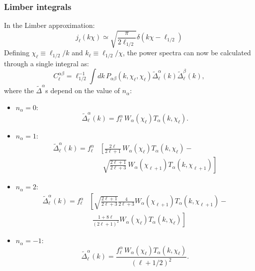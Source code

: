 \documentclass[\docopts]{\docclass}
\begin{document}
\subsubsection*{Limber integrals}
  In the Limber approximation:
  \begin{equation}
    j_\ell(k\chi)\simeq\sqrt{\frac{\pi}{2\ell_{1/2}}} \delta(k\chi-\ell_{1/2})
  \end{equation}
  Defining $\chi_\ell\equiv \ell_{1/2}/k$ and $k_\ell\equiv\ell_{1/2}/\chi$, the power spectra can now be calculated through a single integral as:
  \begin{equation}
    C^{\alpha\beta}_\ell=\ell_{1/2}^{-1}\int dk\,P_{\alpha\beta}(k,\chi_\ell,\chi_\ell)\tilde{\Delta}^\alpha_\ell(k)\tilde{\Delta}^\beta_\ell(k),
  \end{equation}
  where the $\tilde{\Delta}^\alpha$s depend on the value of $n_\alpha$:
  \begin{itemize}
    \item $n_\alpha=0$:
    \begin{equation}
      \tilde{\Delta}^\alpha_\ell(k)=f^\alpha_\ell\,W_\alpha(\chi_\ell)T_\alpha(k,\chi_\ell).
    \end{equation}
    \item $n_\alpha=1$:
    \begin{align}\nonumber
     \tilde{\Delta}^\alpha_\ell(k)=f^\alpha_\ell&\left[\frac{2\ell}{2\ell+1}\,W_\alpha(\chi_\ell)T_\alpha(k,\chi_\ell)-\right.\\
     &\hspace{5pt}\left.\sqrt{\frac{2\ell+1}{2\ell+3}}\,W_\alpha(\chi_{\ell+1})T_\alpha(k,\chi_{\ell+1})\right]
    \end{align}
    \item $n_\alpha=2$:
    \begin{align}\nonumber
     \tilde{\Delta}^\alpha_\ell(k)=f^\alpha_\ell&\left[\sqrt{\frac{2\ell+1}{2\ell+3}}\frac{4}{2\ell+3}W_\alpha(\chi_{\ell+1})T_\alpha(k,\chi_{\ell+1})-\right.\\
     &\hspace{5pt}\left.\frac{1+8\ell}{(2\ell+1)^2}W_\alpha(\chi_\ell)T_\alpha(k,\chi_\ell)\right]
    \end{align}
    \item $n_\alpha=-1$:
    \begin{equation}
      \tilde{\Delta}^\alpha_\ell(k)=\frac{f^\alpha_\ell\,W_\alpha(\chi_\ell)T_\alpha(k,\chi_\ell)}{(\ell+1/2)^2}.
    \end{equation}
  \end{itemize}
\end{document}
